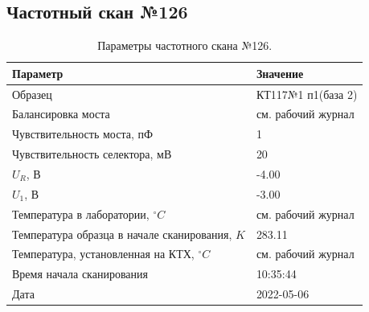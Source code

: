 \subsection{Частотный скан №126}
\begin{table}[!ht]
    \centering
    \caption{Параметры частотного скана №126.}
    \begin{tabular}{|l|l|}
        \hline
        Параметр                                       & Значение                  \\ \hline
        Образец                                        & КТ117№1 п1(база 2)        \\ \hline
        Балансировка моста                             & см. рабочий журнал        \\ \hline
        Чувствительность моста, пФ                     & 1                         \\ \hline
        Чувствительность селектора, мВ                 & 20                        \\ \hline
        $U_R$, В                                       & -4.00                     \\ \hline
        $U_1$, В                                       & -3.00                     \\ \hline
        Температура в лаборатории, $^\circ C$          & см. рабочий журнал        \\ \hline
        Температура образца в начале сканирования, $K$ & 283.11                    \\ \hline
        Температура, установленная на КТХ, $^\circ C$  & см. рабочий журнал        \\ \hline
        Время начала сканирования                      & 10:35:44                  \\ \hline
        Дата                                           & 2022-05-06                \\ \hline
    \end{tabular}
    \label{table:frequency_scan_126}
\end{table}

